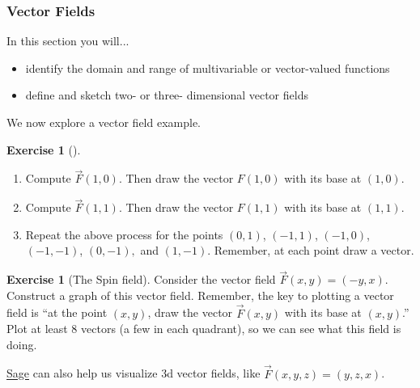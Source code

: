 \documentclass[10pt,]{book}
\theoremstyle{plain}
\theoremstyle{definition}
\theoremstyle{definition}
\theoremstyle{definition}
\theoremstyle{definition}
\newtheorem{exploration}[project]{Exercise}
\theoremstyle{definition}
\numberwithin{equation}{section}
\begin{document}
\subsubsection[{Vector Fields}]{Vector Fields}\label{subsubsection-2}
In this section you will... \leavevmode%
\begin{itemize}[label=\textbullet]
\item{}identify the domain and range of multivariable or vector-valued functions%
\item{}define and sketch two- or three- dimensional vector fields%
\end{itemize}
%
\par
We now explore a vector field example.%
\begin{exploration}[]\label{exploration-119}
\leavevmode%
\begin{enumerate}[font=\bfseries,label=(\alph*),ref=\alph*]
\item\label{task-240} Compute \(\vec F(1,0)\). Then draw the vector \(F(1,0)\) with its base at \((1,0)\).%
\item\label{task-241} Compute \(\vec F(1,1)\). Then draw the vector \(F(1,1)\) with its base at \((1,1)\).%
\item\label{task-242} Repeat the above process for the points \((0,1)\), \((-1,1)\), \((-1,0)\), \((-1,-1)\), \((0,-1),\) and \((1,-1)\). Remember, at each point draw a vector.%
\end{enumerate}
\end{exploration}
\begin{exploration}[The Spin field]\label{exploration-120}
Consider the vector field \(\vec F(x,y)=(-y,x)\). Construct a graph of this vector field. Remember, the key to plotting a vector field is ``at the point \((x,y)\), draw the vector \(\vec F(x,y)\) with its base at \((x,y)\).'' Plot at least 8 vectors (a few in each quadrant), so we can see what this field is doing.%
\end{exploration}
\href{http://aleph.sagemath.org/?z=eJxz06jQqdSp0lSwVdAA0joVmlwFOfkl8WWpySX5RfFpmak5KcYpGm46CkCFusY6xpo6IIUQlkYVhKEJAOGFExs}{Sage} can also help us visualize 3d vector fields, like \(\vec F(x,y,z)=(y,z,x)\).%
\typeout{************************************************}
\typeout{************************************************}
\end{document}
